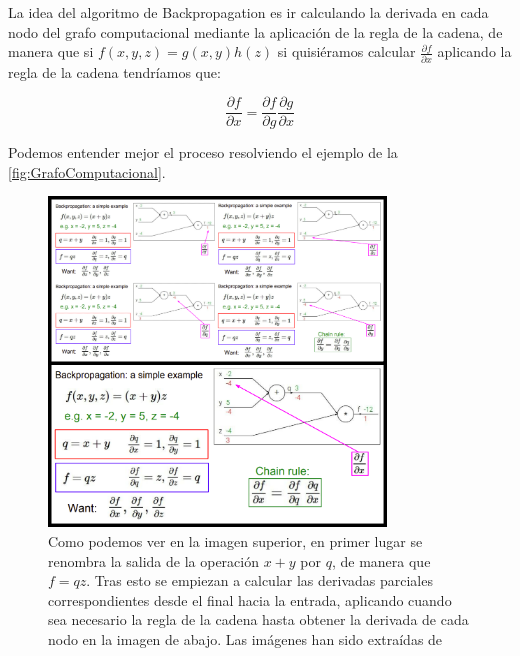             \medskip

            \noindent La idea del algoritmo de Backpropagation es ir calculando la derivada en cada nodo del grafo computacional mediante la aplicación de la regla de la cadena, de manera que si $f(x,y,z)=g(x,y)h(z)$ si quisiéramos calcular $\frac{\partial f}{\partial x}$ aplicando la regla de la cadena tendríamos que: 

            \begin{equation}
                \frac{\partial f}{\partial x}= \frac{\partial f}{\partial g} \frac{\partial g}{\partial x}
            \end{equation}

            
            \noindent Podemos entender mejor el proceso resolviendo el ejemplo de la \autoref{fig:GrafoComputacional}.

            \begin{figure}[!h]
                \centering
                \includegraphics[width=0.8\textwidth]{img/BP_ejemplo.png}
                \caption{Como podemos ver en la imagen superior, en primer lugar se renombra la salida de la operación $x+y$ por $q$, de manera que $f=qz$. Tras esto se empiezan a calcular las derivadas parciales correspondientes desde el final hacia la entrada, aplicando cuando sea necesario la regla de la cadena hasta obtener la derivada de cada nodo en la imagen de abajo. Las imágenes han sido extraídas de \cite{StanfordCourse}}
                \label{fig:Ejemplo BP}
            \end{figure}

